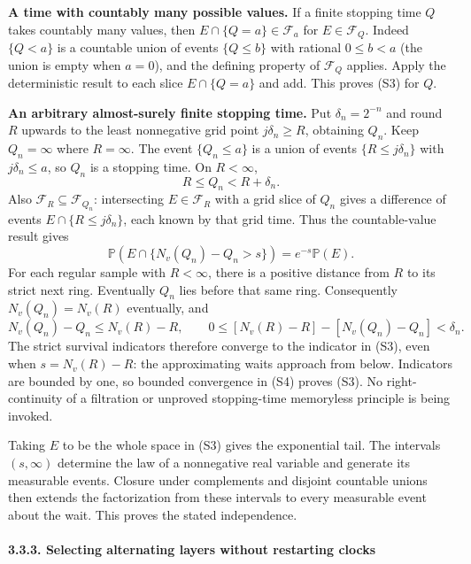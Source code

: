 \documentclass[
  11pt,
  a4paper,
]{article}
\begin{document}
\textbf{A time with countably many possible values.} If a finite
stopping time \(Q\) takes countably many values, then
\(E\cap\{Q=a\}\in\mathcal F_a\) for \(E\in\mathcal F_Q\). Indeed
\(\{Q<a\}\) is a countable union of events \(\{Q\leq b\}\) with rational
\(0\leq b<a\) (the union is empty when \(a=0\)), and the defining
property of \(\mathcal F_Q\) applies. Apply the deterministic result to
each slice \(E\cap\{Q=a\}\) and add. This proves (S3) for \(Q\).

\textbf{An arbitrary almost-surely finite stopping time.} Put
\(\delta_n=2^{-n}\) and round \(R\) upwards to the least nonnegative
grid point \(j\delta_n\geq R\), obtaining \(Q_n\). Keep \(Q_n=\infty\)
where \(R=\infty\). The event \(\{Q_n\leq a\}\) is a union of events
\(\{R\leq j\delta_n\}\) with \(j\delta_n\leq a\), so \(Q_n\) is a
stopping time. On \(R<\infty\), \[
R\leq Q_n<R+\delta_n.
\] Also \(\mathcal F_R\subseteq\mathcal F_{Q_n}\): intersecting
\(E\in\mathcal F_R\) with a grid slice of \(Q_n\) gives a difference of
events \(E\cap\{R\leq j\delta_n\}\), each known by that grid time. Thus
the countable-value result gives \[
\mathbb P(E\cap\{N_v(Q_n)-Q_n>s\})=e^{-s}\mathbb P(E).
\tag{S4}
\] For each regular sample with \(R<\infty\), there is a positive
distance from \(R\) to its strict next ring. Eventually \(Q_n\) lies
before that same ring. Consequently \(N_v(Q_n)=N_v(R)\) eventually, and
\[
N_v(Q_n)-Q_n\leq N_v(R)-R,\qquad
0\leq [N_v(R)-R]-[N_v(Q_n)-Q_n]<\delta_n.
\] The strict survival indicators therefore converge to the indicator in
(S3), even when \(s=N_v(R)-R\): the approximating waits approach from
below. Indicators are bounded by one, so bounded convergence in (S4)
proves (S3). No right-continuity of a filtration or unproved
stopping-time memoryless principle is being invoked.

Taking \(E\) to be the whole space in (S3) gives the exponential tail.
The intervals \((s,\infty)\) determine the law of a nonnegative real
variable and generate its measurable events. Closure under complements
and disjoint countable unions then extends the factorization from these
intervals to every measurable event about the wait. This proves the
stated independence.

\paragraph{3.3.3. Selecting alternating layers without restarting
clocks}\label{selecting-alternating-layers-without-restarting-clocks}
\end{document}
